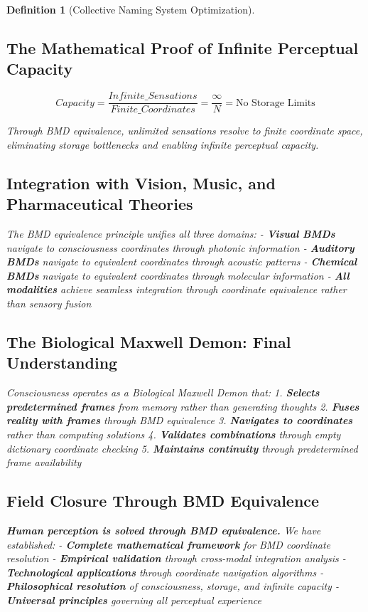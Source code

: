 \documentclass[12pt]{article}
\newtheorem{definition}{Definition}
\begin{document}
\begin{definition}[Collective Naming System Optimization]
\subsection{The Mathematical Proof of Infinite Perceptual Capacity}

$$Capacity = \frac{Infinite\_Sensations}{Finite\_Coordinates} = \frac{\infty}{N} = \text{No Storage Limits}$$

Through BMD equivalence, unlimited sensations resolve to finite coordinate space, eliminating storage bottlenecks and enabling infinite perceptual capacity.

\subsection{Integration with Vision, Music, and Pharmaceutical Theories}

The BMD equivalence principle unifies all three domains:
- \textbf{Visual BMDs} navigate to consciousness coordinates through photonic information
- \textbf{Auditory BMDs} navigate to equivalent coordinates through acoustic patterns  
- \textbf{Chemical BMDs} navigate to equivalent coordinates through molecular information
- \textbf{All modalities} achieve seamless integration through coordinate equivalence rather than sensory fusion

\subsection{The Biological Maxwell Demon: Final Understanding}

Consciousness operates as a Biological Maxwell Demon that:
1. \textbf{Selects predetermined frames} from memory rather than generating thoughts
2. \textbf{Fuses reality with frames} through BMD equivalence
3. \textbf{Navigates to coordinates} rather than computing solutions
4. \textbf{Validates combinations} through empty dictionary coordinate checking
5. \textbf{Maintains continuity} through predetermined frame availability

\subsection{Field Closure Through BMD Equivalence}

\textbf{Human perception is solved through BMD equivalence.} We have established:
- \textbf{Complete mathematical framework} for BMD coordinate resolution
- \textbf{Empirical validation} through cross-modal integration analysis
- \textbf{Technological applications} through coordinate navigation algorithms
- \textbf{Philosophical resolution} of consciousness, storage, and infinite capacity
- \textbf{Universal principles} governing all perceptual experience


\end{definition}
\end{document}
